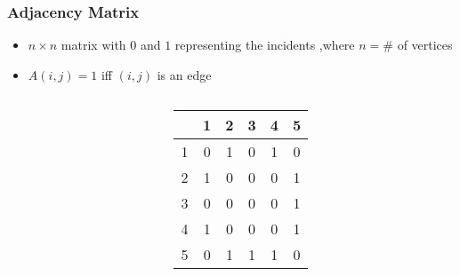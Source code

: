 \documentclass[newPxFont,sthlmFooter,nooffset]{beamer}
\begin{document}
\begin{frame}[t]
  \frametitle{Adjacency Matrix}
  \begin{itemize}
  \item $n \times n$ matrix with $0$ and $1$ representing the incidents ,where $n=\#$ of vertices
  \item $A(i, j) = 1$ iff $(i, j)$ is an edge
  \end{itemize}

    \begin{columns}
      \begin{column}{0.4\textwidth}
      \end{column}
      \begin{column}{0.4\textwidth}
\begin{tabular}{c | c c c c c }
  ~ & 1 & 2 & 3 & 4 & 5 \\ \hline
  1 & 0 & 1 & 0 & 1 & 0 \\ 
  2 & 1 & 0 & 0 & 0 & 1 \\
  3 & 0 & 0 & 0 & 0 & 1 \\
  4 & 1 & 0 & 0 & 0 & 1 \\
  5 & 0 & 1 & 1 & 1 & 0 
\end{tabular}        
      \end{column}
    \end{columns}
\end{frame}
\end{document}
